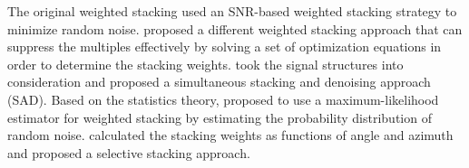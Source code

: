 The original weighted stacking used an SNR-based weighted stacking strategy to minimize random noise. \cite{Schoenberger96} proposed a different weighted stacking approach that can suppress the multiples effectively by solving a set of optimization equations in order to determine the stacking weights. \cite{Neelamani06} took the signal structures into consideration and proposed a simultaneous stacking and denoising approach (SAD). %
Based on the statistics theory, \cite{Trickett07} proposed to use a maximum-likelihood estimator for weighted stacking by estimating the probability distribution of random noise. \cite{Tang07} calculated the stacking weights as functions of angle and azimuth and proposed a selective stacking approach. 

